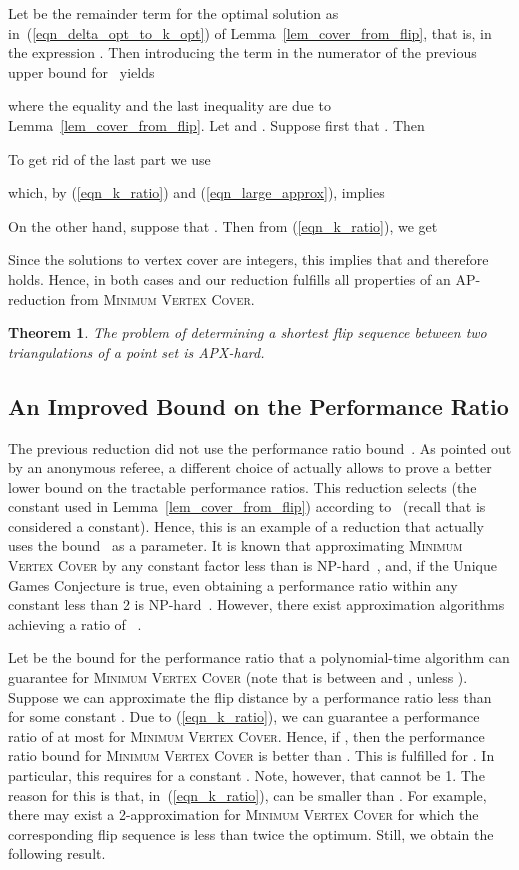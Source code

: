 \documentclass[11pt,a4paper]{article}
\newtheorem{theorem}{Theorem}
\begin{document}
Let  be the remainder term for the optimal solution  as in~(\ref{eqn_delta_opt_to_k_opt}) of Lemma~\ref{lem_cover_from_flip}, that is, in the expression .
Then introducing the term  in the numerator of the previous upper bound for~ yields

where the equality and the last inequality are due to Lemma~\ref{lem_cover_from_flip}.
Let  and .
Suppose first that .
Then

To get rid of the last part we use

which, by (\ref{eqn_k_ratio}) and (\ref{eqn_large_approx}), implies

On the other hand, suppose that .
Then from (\ref{eqn_k_ratio}), we get

Since the solutions to vertex cover are integers, this implies that  and therefore  holds.
Hence, in both cases  and our reduction fulfills all properties of an AP-reduction from \textsc{Minimum Vertex Cover}.

\begin{theorem}
The problem of determining a shortest flip sequence between two triangulations of a point set is APX-hard.
\end{theorem}

\subsection{An Improved Bound on the Performance Ratio}
\label{sec_improved_bound}
The previous reduction did not use the performance ratio bound~.
As pointed out by an anonymous referee, a different choice of  actually allows to prove a better lower bound on the tractable performance ratios.
This reduction selects  (the constant used in Lemma~\ref{lem_cover_from_flip}) according to~ (recall that  is considered a constant).
Hence, this is an example of a reduction that actually uses the bound~ as a parameter.
It is known that approximating \textsc{Minimum Vertex Cover} by any constant factor less than  is NP-hard~\cite{dinur}, and, if the Unique Games Conjecture is true, even obtaining a performance ratio within any constant less than 2 is NP-hard~\cite{khot}.
However, there exist approximation algorithms achieving a ratio of ~\cite{hochbaum,karakostas}.

Let  be the bound for the performance ratio that a polynomial-time algorithm can guarantee for \textsc{Minimum Vertex Cover} (note that  is between  and , unless ).
Suppose we can approximate the flip distance by a performance ratio less than  for some constant .
Due to (\ref{eqn_k_ratio}), we can guarantee a performance ratio of at most  for \textsc{Minimum Vertex Cover}.
Hence, if , then the performance ratio bound for \textsc{Minimum Vertex Cover} is better than .
This is fulfilled for .
In particular, this requires  for a constant .
Note, however, that  cannot be 1.
The reason for this is that, in~(\ref{eqn_k_ratio}),  can be smaller than .
For example, there may exist a 2-approximation for \textsc{Minimum Vertex Cover} for which the corresponding flip sequence is less than twice the optimum.
Still, we obtain the following result.
\end{document}
